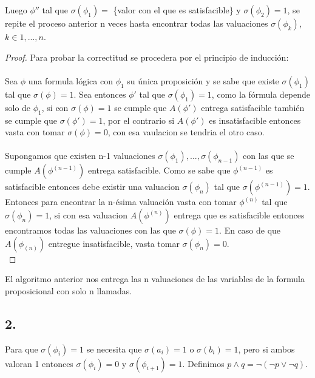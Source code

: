 \documentclass[
	spanish, %
	letterpaper, oneside
]{article}
\begin{document}
Luego $\phi''$ tal que $\sigma(\phi_1) =$ \{valor con el que es satisfacible\} y $\sigma(\phi_2)=1$, se repite el proceso anterior n veces hasta encontrar todas las valuaciones $\sigma (\phi_k)$, $k\in {1,...,n}$.\\
\begin{proof}
	Para probar la correctitud se procedera por el principio de inducción:\\
	\\
Sea $\phi$ una formula lógica con $\phi_{1}$ su única proposición y se sabe que existe $\sigma(\phi_1) $ tal que $\sigma(\phi) = 1$. Sea entonces $\phi'$ tal que $\sigma(\phi_1) = 1$, como la fórmula depende solo de $\phi_1$, si con $\sigma(\phi) = 1$ se cumple que $A(\phi')$ entrega satisfacible también se cumple que $\sigma(\phi')=1$, por el contrario si $A(\phi')$ es insatisfacible entonces vasta con tomar $\sigma(\phi) = 0$, con esa vaulacion se tendria el otro caso.\\
	\\
Supongamos que existen n-1 valuaciones ${\sigma(\phi_1),...,\sigma(\phi_{n-1})}$ con las que se cumple $A(\phi^{(n-1)})$ entrega satisfacible. Como se sabe que $\phi^{(n-1)}$ es satisfacible entonces debe existir una valuacion $\sigma(\phi_n)$ tal que $\sigma(\phi^{(n-1)})=1$. Entonces para encontrar la n-ésima valuación vasta con tomar $\phi^{(n)}$ tal que $\sigma(\phi_n)=1$, si con esa valuacion $A(\phi^{(n)})$ entrega que es satisfacible entonces encontramos todas las valuaciones con las que $\sigma(\phi)=1$. En caso de que $A(\phi_{(n)})$ entregue insatisfacible, vasta tomar $\sigma(\phi_n)=0$.\\
\end{proof}
El algoritmo anterior nos entrega las n valuaciones de las variables de la formula proposicional con solo n llamadas.\\
\newpage

\subsection*{2.}
Para que $\sigma(\phi_i)=1$ se necesita que $\sigma(a_i)=1$ o $\sigma(b_i)=1$, pero si ambos valoran 1 entonces $\sigma(\phi_i)=0$ y $\sigma(\phi_{i+1})=1$. Definimos $p \wedge q = \neg(\neg p \vee \neg q)$. \\
\end{document}

